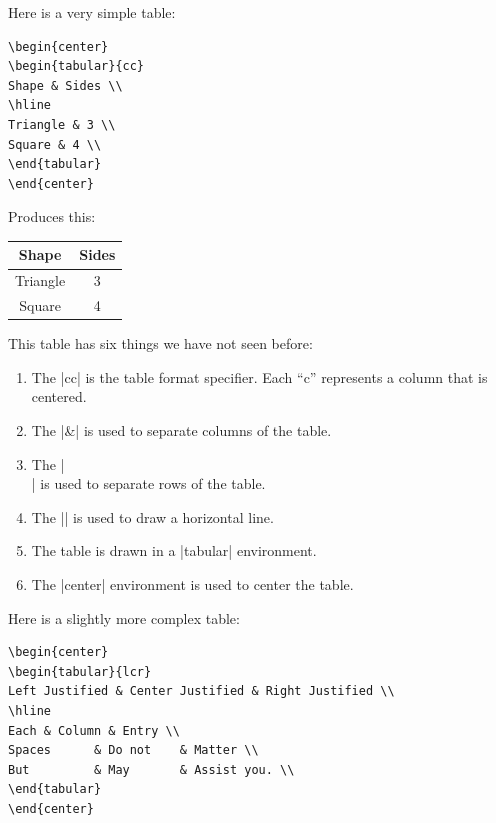 Here is a very simple table:

\begin{Verbatim}
\begin{center}
\begin{tabular}{cc}
Shape & Sides \\
\hline
Triangle & 3 \\
Square & 4 \\
\end{tabular}
\end{center}
\end{Verbatim}

Produces this:

\begin{center}
\begin{tabular}{cc}
Shape & Sides \\
\hline
Triangle & 3 \\
Square & 4 \\
\end{tabular}
\end{center}

This table has six things we have not seen before:

\begin{enumerate}
\item The |{cc}| is the table format specifier. Each ``c'' represents
  a column that is centered.
\item The |&| is used to separate columns of the table.
\item The |\\| is used to separate rows of the table.
\item The |\hline| is used to draw a horizontal line.
\item The table is drawn in a |tabular| environment.
\item The |center| environment is used to center the table.
\end{enumerate}

Here is a slightly more complex table:

\begin{Verbatim}
\begin{center}
\begin{tabular}{lcr}
Left Justified & Center Justified & Right Justified \\
\hline
Each & Column & Entry \\
Spaces      & Do not    & Matter \\
But         & May       & Assist you. \\
\end{tabular}
\end{center}
\end{Verbatim}

